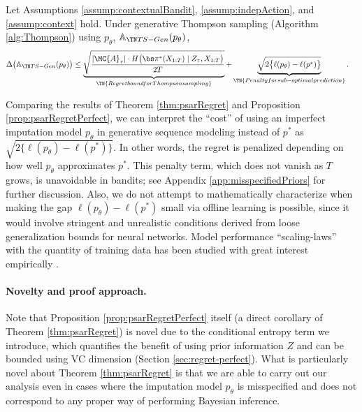 \begin{theorem}
    \label{thm:psarRegret}
    Let Assumptions \ref{assump:contextualBandit}, \ref{assump:indepAction}, and \ref{assump:context} hold. Under generative Thompson sampling (Algorithm \ref{alg:Thompson}) using $p_\theta$, $\psar(p_\theta)$, 
    \begin{align}
        \label{eqn:psarregret}
      \Delta \big( \psar(p_\theta) \big)
      & \leq 
        \underbrace{ \sqrt{ \frac{ |\MC{A}_{\tau}| \cdot H \big( \piX \mid Z_\tau, X_{1:T} \big) }{2 T} } }_{\TN{Regret bound for Thompson sampling}} 
        + \underbrace{ \sqrt{ 2 \big\{ \ell(p_\theta) - \ell(p^*) \big\} } }_{\TN{Penalty for sub-optimal prediction}}.
    \end{align}
\end{theorem}
Comparing the results of Theorem \ref{thm:psarRegret} and Proposition \ref{prop:psarRegretPerfect}, we can interpret the ``cost'' of using an imperfect imputation model $p_\theta$ in generative sequence modeling instead of $p^*$ as $\sqrt{ 2 \big\{ \ell(p_\theta) - \ell(p^*) \big\}}$.
In other words, the regret is penalized depending on how well $p_\theta$ approximates $p^*$. This penalty term, which does not vanish as $T$ grows, is unavoidable in bandits; see Appendix \ref{app:misspecifiedPriors} for further discussion. 
Also, we do not attempt to mathematically characterize when making the gap $\ell(p_\theta) - \ell(p^*)$ small via offline learning is possible, since it would involve stringent and unrealistic conditions derived from loose generalization bounds for neural networks. Model performance ``scaling-laws'' with the quantity of training data has been studied with great interest empirically \citep{henighan2020scaling}.


\paragraph{Novelty and proof approach.}
Note that Proposition \ref{prop:psarRegretPerfect} itself (a direct corollary of Theorem \ref{thm:psarRegret}) is novel due to the conditional entropy term we introduce, which quantifies the benefit of using prior information $Z$ and can be bounded using VC dimension (Section \ref{sec:regret-perfect}). 
What is particularly novel about Theorem \ref{thm:psarRegret} is that we are able to carry out our analysis even in cases where the imputation model $p_\theta$ is misspecified and does not correspond to any proper way of performing Bayesian inference. 


